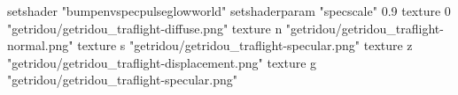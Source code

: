 setshader "bumpenvspecpulseglowworld"
setshaderparam "specscale" 0.9
texture 0 "getridou/getridou_traflight-diffuse.png"
texture n "getridou/getridou_traflight-normal.png"
texture s "getridou/getridou_traflight-specular.png"
texture z "getridou/getridou_traflight-displacement.png"
texture g "getridou/getridou_traflight-specular.png"